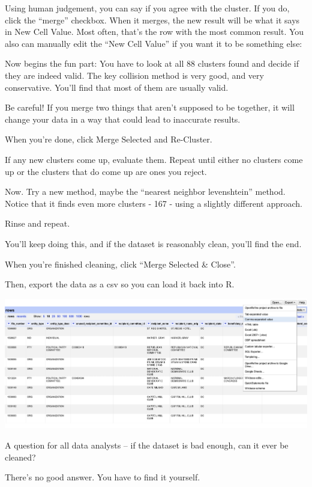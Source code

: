 \documentclass[
  letterpaper,
  DIV=11,
  numbers=noendperiod]{scrreprt}
\begin{document}
Using human judgement, you can say if you agree with the cluster. If you
do, click the ``merge'' checkbox. When it merges, the new result will be
what it says in New Cell Value. Most often, that's the row with the most
common result. You also can manually edit the ``New Cell Value'' if you
want it to be something else:

Now begins the fun part: You have to look at all 88 clusters found and
decide if they are indeed valid. The key collision method is very good,
and very conservative. You'll find that most of them are usually valid.

Be careful! If you merge two things that aren't supposed to be together,
it will change your data in a way that could lead to inaccurate results.

When you're done, click Merge Selected and Re-Cluster.

If any new clusters come up, evaluate them. Repeat until either no
clusters come up or the clusters that do come up are ones you reject.

Now. Try a new method, maybe the ``nearest neighbor levenshtein''
method. Notice that it finds even more clusters - 167 - using a slightly
different approach.

Rinse and repeat.

You'll keep doing this, and if the dataset is reasonably clean, you'll
find the end.

When you're finished cleaning, click ``Merge Selected \& Close''.

Then, export the data as a csv so you can load it back into R.

\includegraphics[width=9.5in,height=\textheight]{./images/open7.png}

A question for all data analysts -- if the dataset is bad enough, can it
ever be cleaned?

There's no good answer. You have to find it yourself.

\end{document}
